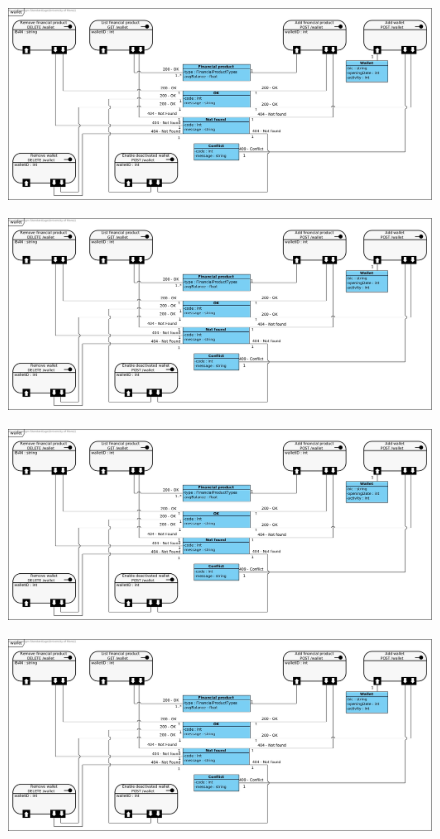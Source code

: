 \documentclass[../rapport.tex]{subfiles}
\begin{document}
\begin{figure}[H]
    \includegraphics[scale=0.288]{ressources/photos_diagrammes/API/wallet.jpg}
\end{figure}

\begin{figure}[H]
    \includegraphics[scale=0.288]{ressources/photos_diagrammes/API/wallet.jpg}
\end{figure}

\begin{figure}[H]
    \includegraphics[scale=0.288]{ressources/photos_diagrammes/API/wallet.jpg}
\end{figure}

\begin{figure}[H]
    \includegraphics[scale=0.288]{ressources/photos_diagrammes/API/wallet.jpg}
\end{figure}
\end{document}
